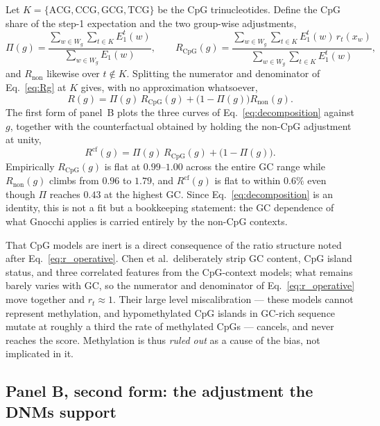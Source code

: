 \documentclass{article}
\begin{document}
Let $K = \{\mathrm{ACG},\mathrm{CCG},\mathrm{GCG},\mathrm{TCG}\}$ be the CpG
trinucleotides. Define the CpG share of the step-1 expectation and the two
group-wise adjustments,
\begin{equation}
    \Pi(g) = \frac{\sum_{w\in W_g}\sum_{t\in K} E_1^{t}(w)}{\sum_{w\in W_g} E_1(w)},
    \qquad
    R_{\mathrm{CpG}}(g) = \frac{\sum_{w\in W_g}\sum_{t\in K} E_1^{t}(w)\, r_t(x_w)}
                    {\sum_{w\in W_g}\sum_{t\in K} E_1^{t}(w)},
\end{equation}
and $R_{\mathrm{non}}$ likewise over $t \notin K$. Splitting the numerator and
denominator of Eq.~\eqref{eq:Rg} at $K$ gives, with no approximation whatsoever,
\begin{equation}
    R(g) = \Pi(g)\, R_{\mathrm{CpG}}(g) + \bigl(1 - \Pi(g)\bigr) R_{\mathrm{non}}(g).
    \label{eq:decomposition}
\end{equation}
The first form of panel~B plots the three curves of
Eq.~\eqref{eq:decomposition} against $g$, together with the counterfactual
obtained by holding the non-CpG adjustment at unity,
\begin{equation}
    R^{\mathrm{cf}}(g) = \Pi(g)\, R_{\mathrm{CpG}}(g) + \bigl(1 - \Pi(g)\bigr).
\end{equation}
Empirically $R_{\mathrm{CpG}}(g)$ is flat at $0.99$--$1.00$ across the entire GC range while
$R_{\mathrm{non}}(g)$ climbs from $0.96$ to $1.79$, and $R^{\mathrm{cf}}(g)$ is flat to
within $0.6\%$ even though $\Pi$ reaches $0.43$ at the highest GC. Since
Eq.~\eqref{eq:decomposition} is an identity, this is not a fit but a bookkeeping
statement: the GC dependence of what Gnocchi applies is carried entirely by the
non-CpG contexts.

That CpG models are inert is a direct consequence of the ratio structure noted
after Eq.~\eqref{eq:r_operative}. Chen et al.\ deliberately strip GC content, CpG
island status, and three correlated features from the CpG-context models; what
remains barely varies with GC, so the numerator and denominator of
Eq.~\eqref{eq:r_operative} move together and $r_t \approx 1$. Their large level
miscalibration --- these models cannot represent methylation, and hypomethylated
CpG islands in GC-rich sequence mutate at roughly a third the rate of methylated
CpGs --- cancels, and never reaches the score. Methylation is thus \emph{ruled
out} as a cause of the bias, not implicated in it.

\subsection{Panel B, second form: the adjustment the DNMs support}
\end{document}
